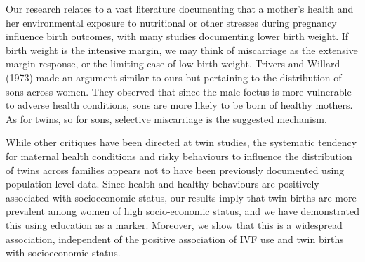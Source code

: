 \documentclass{nature}
\begin{document}
\begin{linenumbers}
Our research relates to a vast literature documenting that a mother's health and her environmental exposure to nutritional or other stresses during pregnancy influence birth outcomes, with many studies documenting lower birth weight\cite{CurrieMoretti2007,Bernsteinetal2005,SerranoDomeque2014}. If birth weight is the intensive margin, we may think of miscarriage as the extensive margin response, or the limiting case of low birth weight. %
Trivers and Willard (1973) made an argument similar to ours but pertaining to the distribution of sons across women. They observed that since the male foetus is more vulnerable to adverse health conditions, sons are more likely to be born of healthy mothers. As for twins, so for sons, selective miscarriage is the suggested mechanism.


While other critiques have been directed at twin studies, the systematic tendency for maternal health conditions and risky behaviours to influence the distribution of twins across families appears not to have been previously documented using population-level data. Since health and healthy behaviours are positively associated with socioeconomic status, our results imply that twin births are more prevalent among women of high socio-economic status, and we have demonstrated this using education as a marker. Moreover, we show that this is a widespread association, independent of the positive association of IVF use and twin births with socioeconomic status.


\end{linenumbers}
\end{document}
